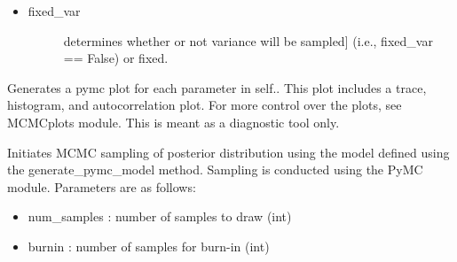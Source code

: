 \documentclass[letterpaper,10pt,english]{sphinxmanual}
\begin{document}
\begin{fulllineitems}
\begin{fulllineitems}
\begin{itemize}
\begin{description}
\end{description}

\item {} \begin{description}
\item[{fixed\_var}] \leavevmode{[}determines whether or not variance will be sampled{]}
(i.e., fixed\_var == False) or fixed.

\end{description}

\end{itemize}

\end{fulllineitems}


\begin{fulllineitems}
\label{\detokenize{source_code:smcpy.mcmc.mcmc_sampler.MCMCSampler.pymcplot}}
Generates a pymc plot for each parameter in self.. This plot
includes a trace, histogram, and autocorrelation plot. For more control
over the plots, see MCMCplots module. This is meant as a diagnostic
tool only.

\end{fulllineitems}


\begin{fulllineitems}
\label{\detokenize{source_code:smcpy.mcmc.mcmc_sampler.MCMCSampler.sample}}
Initiates MCMC sampling of posterior distribution using the
model defined using the generate\_pymc\_model method. Sampling is
conducted using the PyMC module. Parameters are as follows:
\begin{itemize}
\item {} 
num\_samples : number of samples to draw (int)

\item {} 
burnin : number of samples for burn-in (int)


\end{itemize}
\end{fulllineitems}
\end{fulllineitems}
\end{document}
